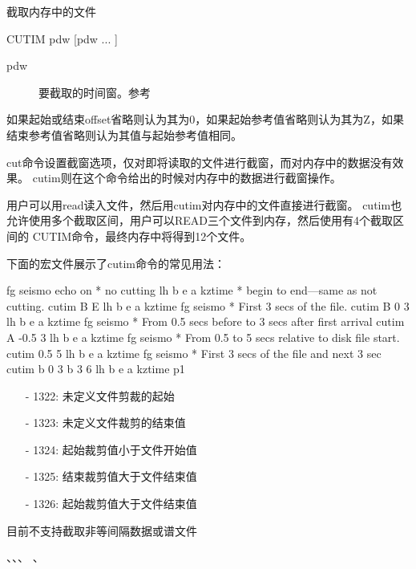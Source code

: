 \label{cmd:cutim}

截取内存中的文件

\begin{SACSTX}
CUTIM pdw [pdw ... ]
\end{SACSTX}

\begin{description}
\item [pdw] 要截取的时间窗。参考
\end{description}

如果起始或结束offset省略则认为其为0，如果起始参考值省略则认为其为Z，如果结束参考值省略则认为其值与起始参考值相同。

cut命令设置截窗选项，仅对即将读取的文件进行截窗，而对内存中的数据没有效果。
cutim则在这个命令给出的时候对内存中的数据进行截窗操作。

用户可以用read读入文件，然后用cutim对内存中的文件直接进行截窗。
cutim也允许使用多个截取区间，用户可以READ三个文件到内存，然后使用有4个截取区间的
CUTIM命令，最终内存中将得到12个文件。

下面的宏文件展示了cutim命令的常见用法：
\begin{SACCode}
fg seismo
echo on
* no cutting
lh b e a kztime
* begin to end---same as not cutting. 
cutim B E
lh b e a kztime
fg seismo
* First 3 secs of the file.
cutim B 0 3 
lh b e a kztime
fg seismo
* From 0.5 secs before to 3 secs after first arrival
cutim A -0.5 3
lh b e a kztime
fg seismo
* From 0.5 to 5 secs relative to disk file start.
cutim 0.5 5 
lh b e a kztime
fg seismo
* First 3 secs of the file and next 3 sec
cutim b 0 3 b 3 6 
lh b e a kztime
p1
\end{SACCode}

\begin{itemize}
\item[-]1322: 未定义文件剪裁的起始
\item[-]1323: 未定义文件裁剪的结束值
\item[-]1324: 起始裁剪值小于文件开始值
\item[-]1325: 结束裁剪值大于文件结束值
\item[-]1326: 起始裁剪值大于文件结束值
\end{itemize}

目前不支持截取非等间隔数据或谱文件

、、、
、
